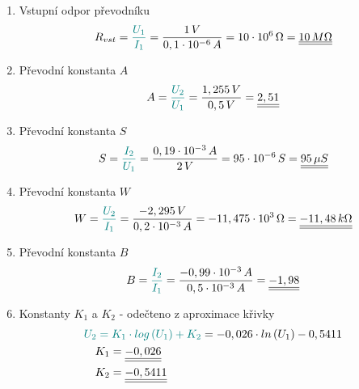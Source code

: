\documentclass[a4paper, czech]{article}
\begin{document}
\begin{enumerate}
    \item Vstupní odpor převodníku
    \begin{multline*}
        R_{vst} = \textcolor{teal}{\frac{U_1}{I_1}} = \frac{1 \, V}{0,1 \cdot 10^{-6} \, A} = 10 \cdot 10^{6} \, \Omega = \underline{\underline{10 \, M \Omega}} \hfill
    \end{multline*}

    \item Převodní konstanta $A$
    \begin{multline*}
        A = \textcolor{teal}{\frac{U_2}{U_1}} = \frac{1,255 \, V}{0,5 \, V} = \underline{\underline{2,51}} \hfill
    \end{multline*}

    \item Převodní konstanta $S$
    \begin{multline*}
        S = \textcolor{teal}{\frac{I_2}{U_1}} = \frac{0,19 \cdot 10^{-3} \, A}{2 \, V} = 95 \cdot 10^{-6} \, S = \underline{\underline{95 \, \mu S}} \hfill
    \end{multline*}

    \item Převodní konstanta $W$
    \begin{multline*}
        W = \textcolor{teal}{\frac{U_2}{I_1}} = \frac{-2,295 \, V}{0,2 \cdot 10^{-3} \, A} = -11,475 \cdot 10^{3} \, \Omega = \underline{\underline{-11,48 \, k \Omega}} \hfill
    \end{multline*}

    \item Převodní konstanta $B$
    \begin{multline*}
        B = \textcolor{teal}{\frac{I_2}{I_1}} = \frac{-0,99 \cdot 10^{-3} \, A}{0,5 \cdot 10^{-3} \, A} = \underline{\underline{-1,98}} \hfill
    \end{multline*}

    \item Konstanty $K_1$ a $K_2$ - odečteno z aproximace křivky
    \begin{multline*}
        \textcolor{teal}{U_2 = K_1 \cdot log \left(U_1\right) + K_2} = -0,026 \cdot ln \left(U_1\right) - 0,5411 \hfill \\
        \ \ \ K_1 = \underline{\underline{-0,026}} \hfill \\
        \ \ \ K_2 = \underline{\underline{-0,5411}} \hfill
    \end{multline*}
\end{enumerate}
\end{document}
